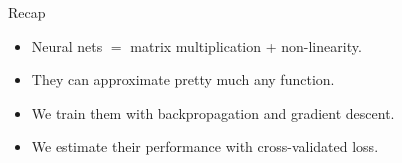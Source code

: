 \begin{frame}{Recap}
	\begin{itemize}
		\item Neural nets $=$ matrix multiplication + non-linearity.
		\item They can approximate pretty much any function.
		\item We train them with backpropagation and gradient descent.
		\item We estimate their performance with cross-validated loss.
	\end{itemize}
\end{frame}
